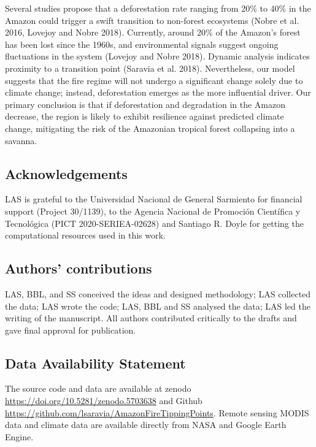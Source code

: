 \documentclass[
]{article}
\begin{document}
Several studies propose that a deforestation rate ranging from 20\% to
40\% in the Amazon could trigger a swift transition to non-forest
ecosystems (Nobre et al. 2016, Lovejoy and Nobre 2018). Currently,
around 20\% of the Amazon's forest has been lost since the 1960s, and
environmental signals suggest ongoing fluctuations in the system
(Lovejoy and Nobre 2018). Dynamic analysis indicates proximity to a
transition point (Saravia et al. 2018). Nevertheless, our model suggests
that the fire regime will not undergo a significant change solely due to
climate change; instead, deforestation emerges as the more influential
driver. Our primary conclusion is that if deforestation and degradation
in the Amazon decrease, the region is likely to exhibit resilience
against predicted climate change, mitigating the risk of the Amazonian
tropical forest collapsing into a savanna.

\subsection{Acknowledgements}\label{acknowledgements}

LAS is grateful to the Universidad Nacional de General Sarmiento for
financial support (Project 30/1139), to the Agencia Nacional de
Promoción Científica y Tecnológica (PICT 2020-SERIEA-02628) and Santiago
R. Doyle for getting the computational resources used in this work.

\subsection{Authors' contributions}\label{authors-contributions}

LAS, BBL, and SS conceived the ideas and designed methodology; LAS
collected the data; LAS wrote the code; LAS, BBL and SS analysed the
data; LAS led the writing of the manuscript. All authors contributed
critically to the drafts and gave final approval for publication.

\subsection{Data Availability
Statement}\label{data-availability-statement}

The source code and data are available at zenodo
\url{https://doi.org/10.5281/zenodo.5703638} and Github
\url{https://github.com/lsaravia/AmazonFireTippingPoints}. Remote
sensing MODIS data and climate data are available directly from NASA and
Google Earth Engine.
\end{document}
